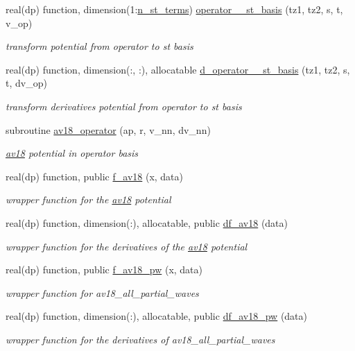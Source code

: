 \begin{DoxyCompactItemize}
real(dp) function, dimension(1\+:\hyperlink{namespaceav18_ae95361ff4578323939542bc0807d127d}{n\+\_\+st\+\_\+terms}) \hyperlink{namespaceav18_aa01617c5c79d9290a3dce13819b9ef72}{operator\+\_\+\_\+st\+\_\+basis} (tz1, tz2, s, t, v\+\_\+op)
\begin{DoxyCompactList}\small\item\em transform potential from operator to st basis \end{DoxyCompactList}\item 
real(dp) function, dimension(\+:, \+:), allocatable \hyperlink{namespaceav18_a19a966bb1b322e2d9e2c8816a6634ebb}{d\+\_\+operator\+\_\+\_\+st\+\_\+basis} (tz1, tz2, s, t, dv\+\_\+op)
\begin{DoxyCompactList}\small\item\em transform derivatives potential from operator to st basis \end{DoxyCompactList}\item 
subroutine \hyperlink{namespaceav18_a371b28a37a073022fcb2d0cedc770b21}{av18\+\_\+operator} (ap, r, v\+\_\+nn, dv\+\_\+nn)
\begin{DoxyCompactList}\small\item\em \hyperlink{namespaceav18}{av18} potential in operator basis \end{DoxyCompactList}\item 
real(dp) function, public \hyperlink{namespaceav18_a111cfac79051da99e0b5895e5370c2bc}{f\+\_\+av18} (x, data)
\begin{DoxyCompactList}\small\item\em wrapper function for the \hyperlink{namespaceav18}{av18} potential \end{DoxyCompactList}\item 
real(dp) function, dimension(\+:), allocatable, public \hyperlink{namespaceav18_a6bc9abd9cec28d438ad5228c84238cbb}{df\+\_\+av18} (data)
\begin{DoxyCompactList}\small\item\em wrapper function for the derivatives of the \hyperlink{namespaceav18}{av18} potential \end{DoxyCompactList}\item 
real(dp) function, public \hyperlink{namespaceav18_a4092b1449c0991611a4a0be131e56e66}{f\+\_\+av18\+\_\+pw} (x, data)
\begin{DoxyCompactList}\small\item\em wrapper function for av18\+\_\+all\+\_\+partial\+\_\+waves \end{DoxyCompactList}\item 
real(dp) function, dimension(\+:), allocatable, public \hyperlink{namespaceav18_a8b7b43084d226bd7404444269717d26c}{df\+\_\+av18\+\_\+pw} (data)
\begin{DoxyCompactList}\small\item\em wrapper function for the derivatives of av18\+\_\+all\+\_\+partial\+\_\+waves \end{DoxyCompactList}\end{DoxyCompactItemize}
